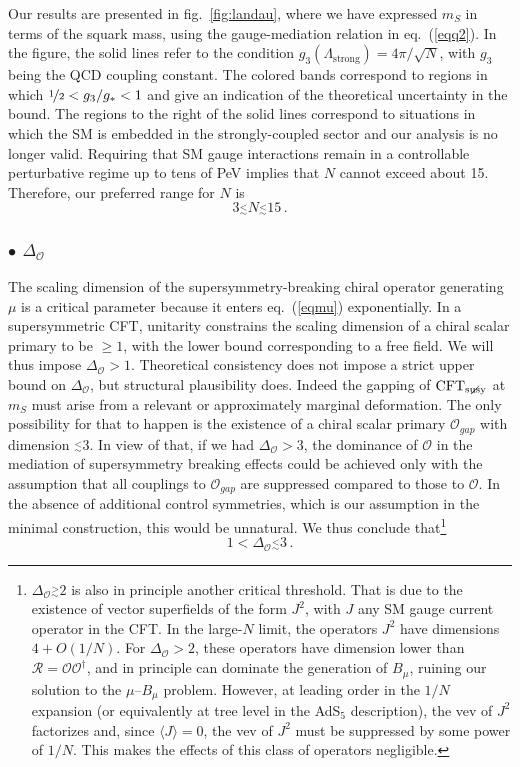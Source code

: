 \documentclass[a4paper,12pt]{article}
\newcommand{\lsim}{\stackrel{<}{_\sim}}
\newcommand{\gsim}{\stackrel{>}{_\sim}}
\newcommand{\beq}{\begin{equation}}
\newcommand{\eeq}{\end{equation}}
\def\eq#1{eq.~(\ref{#1})}
\def\fig#1{fig.~\ref{#1}}
\def\eq#1{eq.~(\ref{#1})}
\def\fig#1{fig.~\ref{#1}}
\def\O{\mathcal{O}}
\def\R{\mathcal{R}}
\def\mS{m_S}
\def\CFTs{{\rm CFT}_ {{\rm susy}\! \! \! \! \! \! \! \!\diagup \,\,\,}}
\begin{document}
Our results are presented in \fig{fig:landau}, where we have expressed $\mS$ in terms of the squark mass, using the gauge-mediation relation in \eq{eqq2}. In the figure, the solid lines refer to the condition $g_3 (\Lambda_{\textrm{strong}}) =4 \pi/\sqrt{N}$, with $g_3$ being the QCD coupling constant.
 The colored bands correspond to regions in which $\nicefrac12 <g_3/g_*<1$ and give an indication of the theoretical uncertainty in the bound. The regions to the right of the solid lines correspond to situations in which the SM is embedded in the strongly-coupled sector and our analysis is no longer valid. Requiring that SM gauge interactions remain in a controllable perturbative regime up to tens of PeV implies that $N$ cannot exceed about 15. Therefore, our preferred range for $N$ is
\beq
3\lsim N \lsim 15 \, .
\label{N515}
\eeq

\boldmath
\subsubsection*{$\bullet$ $\Delta_\O$}
\unboldmath

The scaling dimension of the supersymmetry-breaking chiral operator generating $\mu$ is a critical parameter because it enters \eq{eqmu} exponentially. In a supersymmetric CFT, unitarity constrains the scaling dimension of a chiral scalar primary to be $\geq 1$, with the lower bound corresponding to a free field. We will thus impose $\Delta_\O >1$.
Theoretical consistency does not impose a strict upper bound on $\Delta_\O $, but  structural plausibility does. Indeed the gapping of $\CFTs$  at $m_S$ must arise from a relevant or approximately marginal deformation. The only possibility for that to happen is the existence of a chiral scalar primary $\O_{gap}$ with dimension $\lsim 3$. In view of that, if we had  $\Delta_\O >3$,
the dominance of $\O$ in the mediation of supersymmetry breaking effects could be achieved only with the assumption that all couplings to $\O_{gap}$ are suppressed compared to those to $\O$. In the absence of additional control symmetries, which is our assumption in the minimal construction, this would be unnatural. We thus conclude that\footnote{$\Delta_\O\gsim 2$ is also  in principle another critical threshold. That is due to the existence of vector superfields of the form $J^2$, with  $J$  any SM gauge current operator in the CFT. In the large-$N$ limit, the operators $J^2$ have dimensions $4+O(1/N)$. For $\Delta_\O>2$, these operators have dimension lower than   $\R=\O\O^\dagger$, and in principle can dominate the generation of $B_\mu$, ruining our solution to the $\mu$--$B_\mu$ problem. However, at leading order in the $1/N$ expansion (or equivalently at tree level in the AdS$_5$ description), the vev of $J^2$ factorizes and, since $\langle J\rangle =0$, the vev of $J^2$ must be suppressed by some power of $1/N$. This makes the effects of this class of operators negligible.} 
\beq
1<\Delta_\O \lsim 3 \, .
\label{D12}
\eeq
\end{document}
